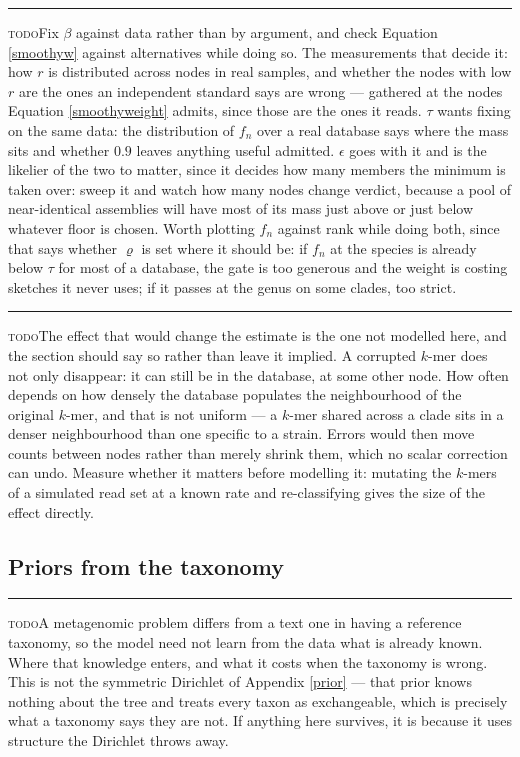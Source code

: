 \documentclass[pdflatex,sn-vancouver-num]{sn-jnl}
\newif\ifshowtodos \showtodostrue
\newcommand{\todo}[1]{%
  \ifshowtodos
    \par\addvspace{0.7\baselineskip}%
    \begin{list}{}{%
      \setlength{\leftmargin}{1.5em}%
      \setlength{\rightmargin}{1.5em}%
      \setlength{\topsep}{0pt}%
      \setlength{\partopsep}{0pt}%
      \setlength{\parsep}{0.5\baselineskip}%
      \setlength{\itemsep}{0pt}%
    }%
    \item[]\footnotesize\color{black!70}%
      \textcolor{orange!65!black}{\rule[-0.2ex]{2pt}{1.15ex}}\hspace{0.55em}%
      \textcolor{orange!65!black}{\textsc{todo}}\hspace{0.6em}\ignorespaces#1%
    \end{list}%
    \addvspace{0.7\baselineskip}%
  \fi%
}
\begin{document}
    \todo{Fix $\beta$ against data rather than by argument, and check
    Equation \eqref{smoothyw} against alternatives while doing so. The measurements that decide it:
    how $r$ is distributed across nodes in real samples, and whether the nodes with low $r$ are the
    ones an independent standard says are wrong --- gathered at the nodes
    Equation \eqref{smoothyweight} admits, since those are the ones it reads. $\tau$ wants fixing on
    the same data: the distribution of $f_n$ over a real database says where the mass sits and
    whether $0.9$ leaves anything useful admitted. $\epsilon$ goes with it and is the likelier of the
    two to matter, since it decides how many members the minimum is taken over: sweep it and watch
    how many nodes change verdict, because a pool of near-identical assemblies will have most of its
    mass just above or just below whatever floor is chosen. Worth plotting $f_n$ against rank while
    doing both, since that says whether $\varrho$ is set where it should be: if $f_n$ at the species
    is already below $\tau$ for most of a database, the gate is too generous and the weight is
    costing sketches it never uses; if it passes at the genus on some clades, too strict.}


    \todo{The effect that would change the estimate is the one not modelled here, and the section
    should say so rather than leave it implied. A corrupted $k$-mer does not only disappear: it can
    still be in the database, at some other node. How often depends on how densely the database
    populates the neighbourhood of the original $k$-mer, and that is not uniform --- a $k$-mer shared
    across a clade sits in a denser neighbourhood than one specific to a strain. Errors would then
    move counts between nodes rather than merely shrink them, which no scalar correction can undo.
    Measure whether it matters before modelling it: mutating the $k$-mers of a simulated read set at a
    known rate and re-classifying gives the size of the effect directly.}

    \subsection{Priors from the taxonomy}\label{priors}
    \todo{A metagenomic problem differs from a text one in having a reference taxonomy, so the model
    need not learn from the data what is already known. Where that knowledge enters, and what it
    costs when the taxonomy is wrong. This is not the symmetric Dirichlet of
    Appendix \ref{prior} --- that prior knows nothing about the tree and treats every taxon as
    exchangeable, which is precisely what a taxonomy says they are not. If anything here survives, it
    is because it uses structure the Dirichlet throws away.}
\end{document}
